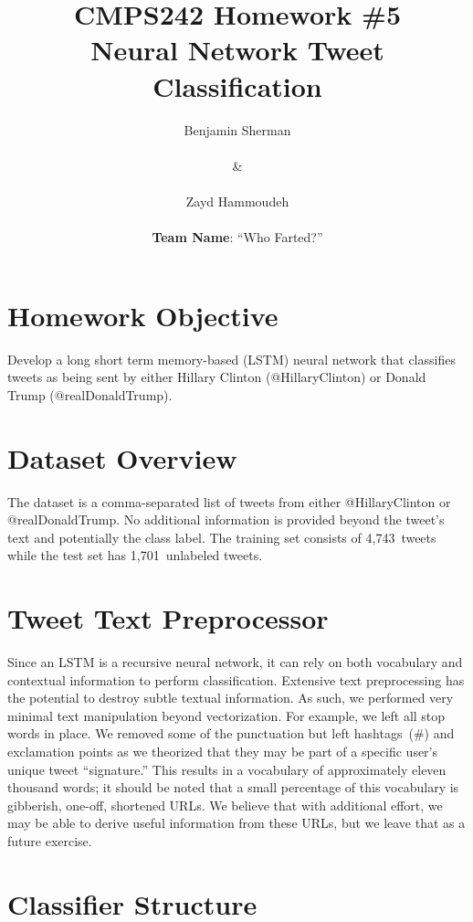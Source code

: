 \documentclass{report}
\title{\textbf{CMPS242 Homework \#5 \textendash{} \\Neural Network Tweet Classification}}
\author{Benjamin Sherman \\~\\ \& \\~\\ Zayd Hammoudeh \\~\\ \textbf{Team Name}: ``Who Farted?''}
\date{} %
\begin{document}
  \maketitle
  
  \suppressfloats %
  \section{Homework Objective}
  
  Develop a long short term memory-based (LSTM) neural network that classifies tweets as being sent by either Hillary Clinton (@HillaryClinton) or Donald Trump (@realDonaldTrump).
  
  \section{Dataset Overview}
  
  The dataset is a comma-separated list of tweets from either @HillaryClinton or @realDonaldTrump.  No additional information is provided beyond the tweet's text and potentially the class label.  The training set consists of 4,743~tweets while the test set has 1,701~unlabeled tweets.
   
  \section{Tweet Text Preprocessor}\label{sec:textPreprocessor}
  
  Since an LSTM is a recursive neural network, it can rely on both vocabulary and contextual information to perform classification.  Extensive text preprocessing has the potential to destroy subtle textual information.  As such, we performed very minimal text manipulation beyond vectorization.  For example, we left all stop words in place.  We removed some of the punctuation but left hashtags~(\#) and exclamation points as we theorized that they may be part of a specific user's unique tweet ``signature.''  This results in a vocabulary of approximately eleven thousand words; it should be noted that a small percentage of this vocabulary is gibberish, one-off, shortened URLs.  We believe that with additional effort, we may be able to derive useful information from these URLs, but we leave that as a future exercise.
   
  \section{Classifier Structure}
  
\end{document}
